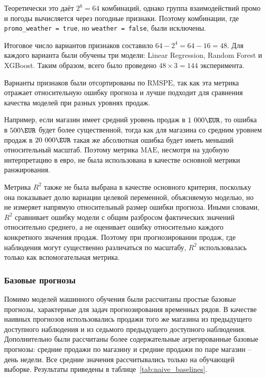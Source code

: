 \documentclass[12pt,a4paper]{article}
\numberwithin{equation}{section}
\begin{document}
Теоретически это даёт $2^6 = 64$ комбинаций, однако группа взаимодействий промо и погоды вычисляется через погодные признаки. Поэтому комбинации, где
\texttt{promo\_weather = true}, но \texttt{weather = false}, были исключены.

Итоговое число вариантов признаков составило \(64-2^4=64-16=48\). Для каждого варианта были
обучены три модели: Linear Regression, Random Forest и XGBoost. Таким образом, всего было проведено
$48 \times 3 = 144$ эксперимента.

Варианты признаков были отсортированы по \(\mathrm{RMSPE}\), так как эта метрика отражает относительную ошибку прогноза и лучше подходит для сравнения качества моделей при разных уровнях продаж.

Например, если магазин имеет средний уровень продаж в \(1\ 000\EUR\), то ошибка в \(500\EUR\) будет более существенной, тогда как для магазина со средним уровнем продаж в \(20\ 000\EUR\) такая же абсолютная ошибка будет иметь меньший относительный масштаб. Поэтому метрика \(\mathrm{MAE}\), несмотря на удобную интерпретацию в евро, не была использована в качестве основной метрики ранжирования.

Метрика \(R^2\) также не была выбрана в качестве основного критерия, поскольку она показывает долю вариации целевой переменной, объясняемую моделью, но не измеряет напрямую относительный размер ошибки прогноза. Иными словами, \(R^2\) сравнивает ошибку модели с общим разбросом фактических значений относительно среднего, а не оценивает ошибку относительно каждого конкретного значения продаж. Поэтому при прогнозировании продаж, где наблюдения могут существенно различаться по масштабу, \(R^2\) использовалась только как вспомогательная метрика.

\subsubsection{Базовые прогнозы}

Помимо моделей машинного обучения были рассчитаны простые базовые прогнозы, характерные для задач прогнозирования временных рядов. В качестве наивных прогнозов использовались продажи того же магазина из предыдущего доступного наблюдения и из седьмого предыдущего доступного наблюдения. Дополнительно были рассчитаны более содержательные агрегированные базовые прогнозы: средние продажи по магазину и средние продажи по паре магазин -- день недели. Все средние значения рассчитывались только на обучающей выборке. Результаты приведены в таблице~\ref{tab:naive_baselines}.
\end{document}
